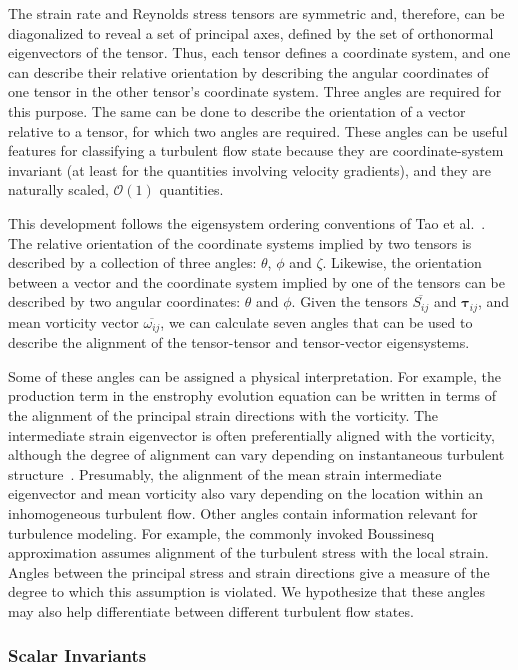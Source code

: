 The strain rate and Reynolds stress tensors are symmetric and, therefore, can be diagonalized to reveal a set of principal axes, deﬁned by the set of orthonormal eigenvectors of the tensor. Thus, each tensor deﬁnes a coordinate system, and one can describe their relative orientation by describing the angular coordinates of one tensor in the other tensor's coordinate system. Three angles are required for this purpose. The same can be done to describe the orientation of a vector relative to a tensor, for which two angles are required. These angles can be useful features for classifying a turbulent ﬂow state because they are coordinate-system invariant (at least for the quantities involving velocity gradients), and they are naturally scaled, $\mathcal{O}(1)$ quantities.

This development follows the eigensystem ordering conventions of Tao et al.~\cite{tao2002statistical}. The relative orientation of the coordinate systems implied by two tensors is described by a collection of three angles: $\theta$, $\phi$ and $\zeta$. Likewise, the orientation between a vector and the coordinate system implied by one of the tensors can be described by two angular coordinates: $\theta$ and $\phi$. Given the tensors $\overline{S_{ij}}$ and $\boldsymbol{\tau}_{ij}$, and mean vorticity vector $\overline{\omega_{ij}}$, we can calculate seven angles that can be used to describe the alignment of the tensor-tensor and tensor-vector eigensystems.

Some of these angles can be assigned a physical interpretation. For example, the production term in the
enstrophy evolution equation can be written in terms of the alignment of the principal strain directions with the vorticity. The intermediate strain eigenvector is often preferentially aligned with the vorticity, although the degree of alignment can vary depending on instantaneous turbulent structure~\cite{buchner2016local}. Presumably, the alignment of the mean strain intermediate eigenvector and mean vorticity also vary depending on the location within an inhomogeneous turbulent ﬂow. Other angles contain information relevant for turbulence modeling. For example, the commonly invoked Boussinesq approximation assumes alignment of the turbulent stress with the local strain. Angles between the principal stress and strain directions give a measure of the degree to which this assumption is violated. We hypothesize that these angles may also help differentiate between different turbulent ﬂow states.

\subsubsection{Scalar Invariants}

